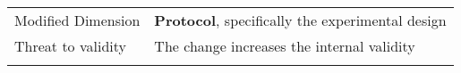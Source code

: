 \begin{table*}[h]
\begin{tabularx}{\textwidth}{
  >{\hsize=0.3\hsize}X
  >{\hsize=0.8\hsize}X}
    Modified Dimension & 
   \textbf{Protocol}, specifically the experimental design  \\ 
    Threat to validity & The change increases the internal validity \\  
   \noalign{\smallskip\smallskip}\hline
    
	\end{tabularx}  
	
\end{table*}
